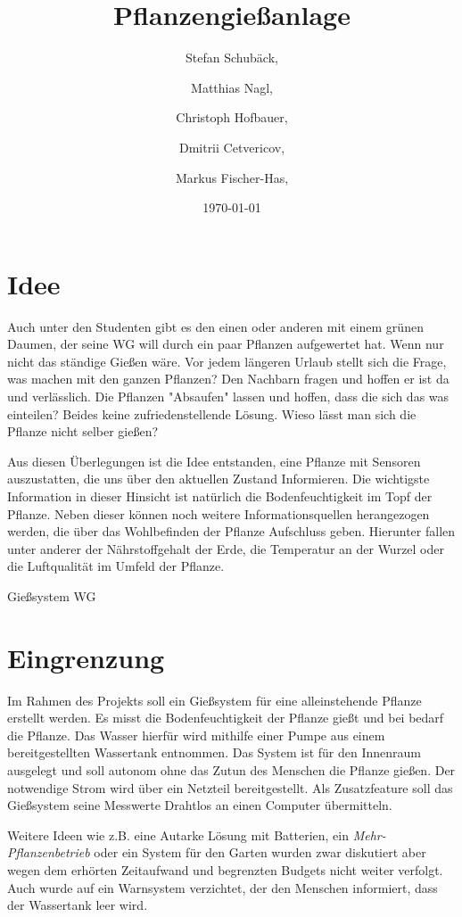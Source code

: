\documentclass[]{IEEEtran}
\title{Pflanzengießanlage}
\date{\today}
\author{ Stefan Schubäck, \and Matthias Nagl,\and Christoph Hofbauer, \and Dmitrii Cetvericov, \and Markus Fischer-Has,}
\begin{document}
	\maketitle


\section{Idee}\label{refIdee}
Auch unter den Studenten gibt es den einen oder anderen mit einem grünen Daumen, der seine WG will durch ein paar Pflanzen aufgewertet hat. Wenn nur nicht das ständige Gießen wäre. Vor jedem längeren Urlaub stellt sich die Frage, was machen mit den ganzen Pflanzen? Den Nachbarn fragen und hoffen er ist da und verlässlich. Die Pflanzen "Absaufen" lassen und hoffen, dass die sich das was einteilen? Beides keine zufriedenstellende Lösung. Wieso lässt man sich die Pflanze nicht selber gießen?

Aus diesen Überlegungen ist die Idee entstanden, eine Pflanze mit Sensoren auszustatten, die uns über den aktuellen Zustand Informieren. Die wichtigste Information in dieser Hinsicht ist natürlich die Bodenfeuchtigkeit im Topf der Pflanze. Neben dieser können noch weitere Informationsquellen herangezogen werden, die über das Wohlbefinden der Pflanze Aufschluss geben. Hierunter fallen unter anderer der Nährstoffgehalt der Erde, die Temperatur an der Wurzel oder die Luftqualität im Umfeld der Pflanze.

Gießsystem WG


\section{Eingrenzung}
Im Rahmen des Projekts soll ein Gießsystem für eine alleinstehende Pflanze erstellt werden. Es misst die Bodenfeuchtigkeit der Pflanze gießt und bei bedarf die Pflanze. Das Wasser hierfür wird mithilfe einer Pumpe aus einem bereitgestellten Wassertank entnommen. Das System ist für den Innenraum ausgelegt und soll autonom ohne das Zutun des Menschen die Pflanze gießen. Der notwendige Strom wird über ein Netzteil bereitgestellt. Als Zusatzfeature soll das Gießsystem seine Messwerte Drahtlos an einen Computer übermitteln.
 
Weitere Ideen wie z.B. eine Autarke Lösung mit Batterien, ein \emph{Mehr-Pflanzenbetrieb} oder ein System für den Garten wurden zwar diskutiert aber wegen dem erhörten Zeitaufwand und begrenzten Budgets nicht weiter verfolgt. Auch wurde auf ein Warnsystem verzichtet, der den Menschen informiert, dass der Wassertank leer wird. 
\end{document}
